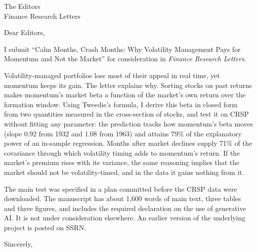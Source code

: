 \documentclass[11pt]{letter}
\date{}
\begin{document}
\begin{letter}{The Editors\\Finance Research Letters}
\opening{Dear Editors,}

I submit ``Calm Months, Crash Months: Why Volatility Management Pays for Momentum and Not the Market'' for consideration in \textit{Finance Research Letters}.

Volatility-managed portfolios lose most of their appeal in real time, yet momentum keeps its gain. The letter explains why. Sorting stocks on past returns makes momentum's market beta a function of the market's own return over the formation window. Using Tweedie's formula, I derive this beta in closed form from two quantities measured in the cross-section of stocks, and test it on CRSP without fitting any parameter: the prediction tracks how momentum's beta moves (slope 0.92 from 1932 and 1.08 from 1963) and attains 79\% of the explanatory power of an in-sample regression. Months after market declines supply 71\% of the covariance through which volatility timing adds to momentum's return. If the market's premium rises with its variance, the same reasoning implies that the market should not be volatility-timed, and in the data it gains nothing from it.

The main test was specified in a plan committed before the CRSP data were downloaded. The manuscript has about 1,600 words of main text, three tables and three figures, and includes the required declaration on the use of generative AI. It is not under consideration elsewhere. An earlier version of the underlying project is posted on SSRN.

\closing{Sincerely,}
\end{letter}
\end{document}
